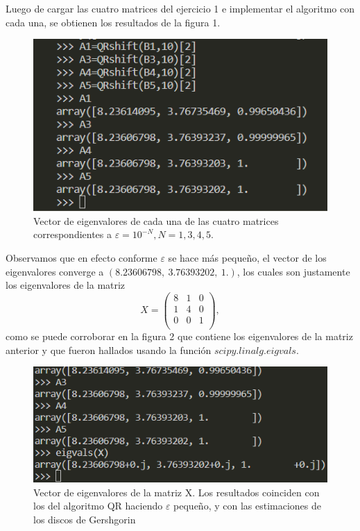 \documentclass[letterpaper]{article}
\newcommand{\1}{\mathds{1}}
\theoremstyle{definition}
\theoremstyle{definition}
\theoremstyle{definition}
\theoremstyle{definition}
\theoremstyle{definition}
\begin{document}
\begin{enumerate}
    Luego de cargar las cuatro matrices del ejercicio 1 e implementar el algoritmo con cada una, 
    se obtienen los resultados de la figura 1.
    \begin{figure}[h!]
        \centering
        \includegraphics[width=0.6\linewidth]{1.png}
        \caption{Vector de eigenvalores de cada una de las cuatro matrices correspondientes a $\varepsilon=10^{-N}, N=1,3,4,5.$}
    \end{figure} 
    Observamos que en efecto conforme $\varepsilon$ se hace más pequeño, el vector de los eigenvalores converge a $(8.23606798,\ 3.76393202,\ 1.)$,
    los cuales son justamente los eigenvalores de la matriz
    \[
        X=\begin{pmatrix}
        8 & 1 & 0\\
        1 & 4 & 0\\
        0 & 0 & 1\\    
        \end{pmatrix},
        \]
        como se puede corroborar en la figura 2 que contiene los eigenvalores de la matriz anterior y que fueron hallados usando 
        la función $scipy.linalg.eigvals$. 
        \begin{figure}[h!]
            \centering
            \includegraphics[width=0.6\linewidth]{2.png}
            \caption{Vector de eigenvalores de la matriz X. Los resultados coinciden con los del algoritmo QR haciendo $\varepsilon$ 
            pequeño, y con las estimaciones de los discos de Gershgorin}
        \end{figure} 


\end{enumerate}
\end{document}
